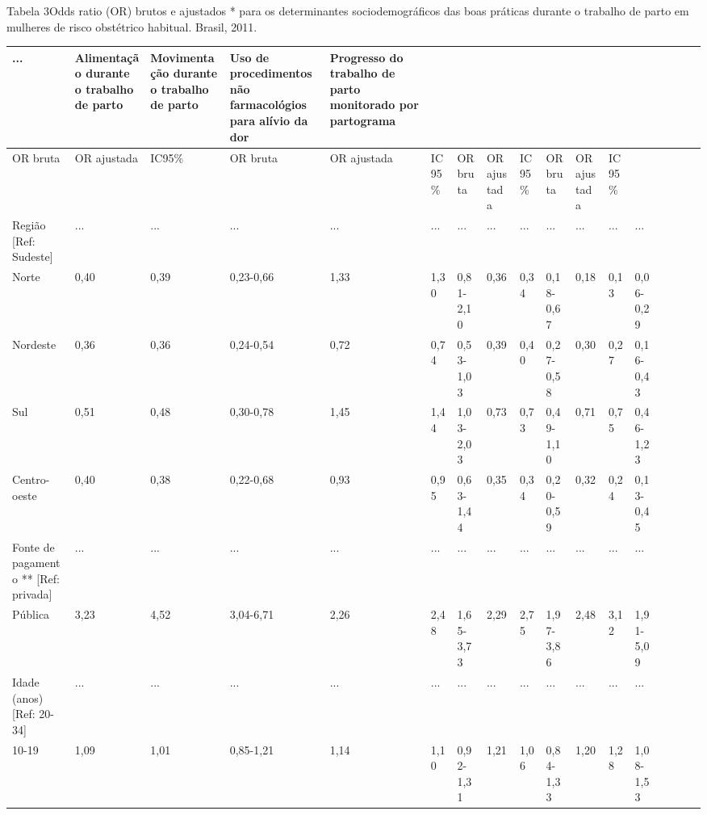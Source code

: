 \documentclass{article}
\begin{document}
Tabela 3Odds ratio (OR) brutos e ajustados * para os determinantes
sociodemográficos das boas práticas durante o trabalho de parto em
mulheres de risco obstétrico habitual. Brasil, 2011.
\begin{table}
\begin{xtabular}{ l | l | l | l | l l | l | l | l | l | l | l | l | l | l | l |
l }
\hline... & Alimentação durante o trabalho de parto & Movimentação durante o trabalho
de parto & Uso de procedimentos não farmacológios para alívio
da dor & Progresso do trabalho de parto monitorado por
partograma\\ \hline
OR bruta & OR ajustada & IC95\% & OR bruta & OR ajustada & IC95\% & OR bruta &
OR ajustada & IC95\% & OR bruta & OR ajustada & IC95\%\\ \hline
Região [Ref: Sudeste]
& ...
& ...
& ...
& ...
& ...
& ...
& ...
& ...
& ...
& ...
& ...
& ...
\\ \hline

Norte
& 0,40
& 0,39
& 0,23-0,66
& 1,33
& 1,30
& 0,81-2,10
& 0,36
& 0,34
& 0,18-0,67
& 0,18
& 0,13
& 0,06-0,29
\\ \hline

Nordeste
& 0,36
& 0,36
& 0,24-0,54
& 0,72
& 0,74
& 0,53-1,03
& 0,39
& 0,40
& 0,27-0,58
& 0,30
& 0,27
& 0,16-0,43
\\ \hline

Sul
& 0,51
& 0,48
& 0,30-0,78
& 1,45
& 1,44
& 1,03-2,03
& 0,73
& 0,73
& 0,49-1,10
& 0,71
& 0,75
& 0,46-1,23
\\ \hline

Centro-oeste
& 0,40
& 0,38
& 0,22-0,68
& 0,93
& 0,95
& 0,63-1,44
& 0,35
& 0,34
& 0,20-0,59
& 0,32
& 0,24
& 0,13-0,45
\\ \hline

Fonte de pagamento ** [Ref: privada]
& ...
& ...
& ...
& ...
& ...
& ...
& ...
& ...
& ...
& ...
& ...
& ...
\\ \hline

Pública
& 3,23
& 4,52
& 3,04-6,71
& 2,26
& 2,48
& 1,65-3,73
& 2,29
& 2,75
& 1,97-3,86
& 2,48
& 3,12
& 1,91-5,09
\\ \hline

Idade (anos) [Ref: 20-34]
& ...
& ...
& ...
& ...
& ...
& ...
& ...
& ...
& ...
& ...
& ...
& ...
\\ \hline

10-19
& 1,09
& 1,01
& 0,85-1,21
& 1,14
& 1,10
& 0,92-1,31
& 1,21
& 1,06
& 0,84-1,33
& 1,20
& 1,28
& 1,08-1,53
\\ \hline


\end{xtabular}
\end{table}
\end{document}
